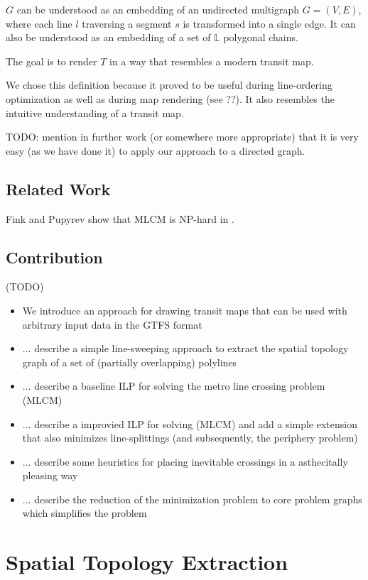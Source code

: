 \documentclass{llncs}
\begin{document}
$G$ can be understood as an embedding of an undirected multigraph $G = (V, E)$, where each line $l$ traversing a segment $s$ is transformed into a single edge. It can also be understood as an embedding of a set of $\mathbb{L}$ polygonal chains.

The goal is to render $T$ in a way that resembles a modern transit map.

We chose this definition because it proved to be useful during line-ordering optimization as well as during map rendering (see ??). It also resembles the intuitive understanding of a transit map.


TODO: mention in further work (or somewhere more appropriate) that it is very easy (as we have done it) to apply our approach to a directed graph.

%
\subsection{Related Work}
%
Fink and Pupyrev show that MLCM is NP-hard in \cite{fink:pupyrev}.
%
\subsection{Contribution}
%
(TODO)
\begin{itemize}
\item We introduce an approach for drawing transit maps that can be used with arbitrary input data in the GTFS format
\item ... describe a simple line-sweeping approach to extract the spatial topology graph of a set of (partially overlapping) polylines
\item ... describe a baseline ILP for solving the metro line crossing problem (MLCM)
\item ... describe a improvied ILP for solving (MLCM) and add a simple extension that also minimizes line-splittings (and subsequently, the periphery problem)
\item ... describe some heuristics for placing inevitable crossings in a asthecitally pleasing way
\item ... describe the reduction of the minimization problem to core problem graphs which simplifies the problem
\end{itemize}

%
\section{Spatial Topology Extraction}
%
\end{document}
